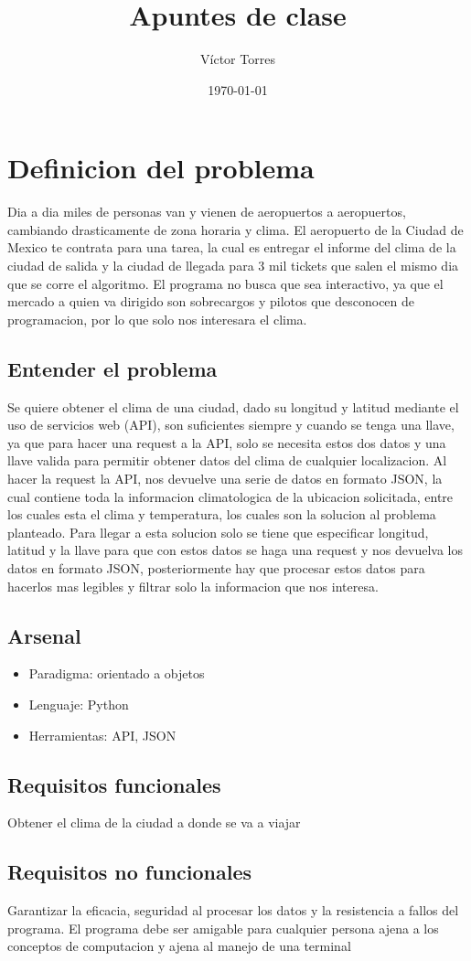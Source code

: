 \documentclass[12pt]{article}
\author{Víctor Torres}
\date{\today}
\title{Apuntes de clase}
\begin{document}
\section{Definicion del problema}
Dia a dia miles de personas van y vienen de aeropuertos a aeropuertos, cambiando drasticamente de zona horaria y clima. El aeropuerto de la Ciudad de Mexico te contrata para una tarea, la cual es entregar el informe del clima de la ciudad de salida y la ciudad de llegada para 3 mil tickets que salen el mismo dia que se corre el algoritmo.
El programa no busca que sea interactivo, ya que el mercado a quien va dirigido son sobrecargos y pilotos que desconocen de programacion, por lo que solo nos interesara el clima.
\subsection{Entender el problema}
Se quiere obtener el clima de una ciudad, dado su longitud y latitud mediante el uso de servicios web (API), son suficientes siempre y cuando se tenga una llave, ya que para hacer una request a la API, solo se necesita estos dos datos y una llave valida para permitir obtener datos del clima de cualquier localizacion. Al hacer la request la API, nos devuelve una serie de datos en formato JSON, la cual contiene toda la informacion climatologica de la ubicacion solicitada, entre los cuales esta el clima y temperatura, los cuales son la solucion al problema planteado. Para llegar a esta solucion solo se tiene que especificar longitud, latitud y la llave para que con estos datos se haga una request y nos devuelva los datos en formato JSON, posteriormente hay que procesar estos datos para hacerlos mas legibles y filtrar solo la informacion que nos interesa.
\subsection{Arsenal}
\begin{itemize}
\item Paradigma: orientado a objetos
\item Lenguaje: Python
\item Herramientas: API, JSON
\end{itemize}
\subsection{Requisitos funcionales}
Obtener el clima de la ciudad a donde se va a viajar
\subsection{Requisitos no funcionales}
Garantizar la eficacia, seguridad al procesar los datos y la resistencia a fallos del programa. El programa debe ser amigable para cualquier persona ajena a los conceptos de computacion y ajena al manejo de una terminal
\end{document}
